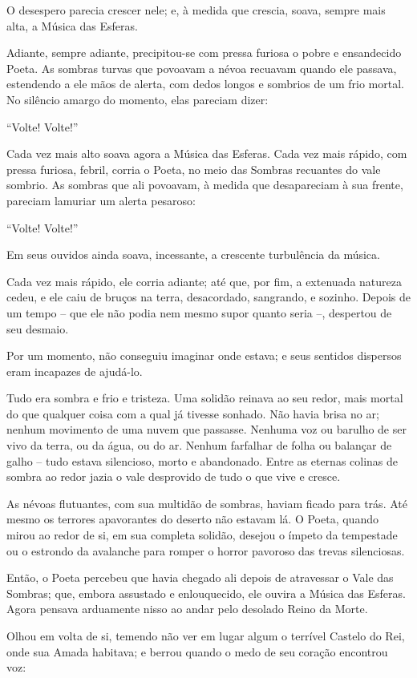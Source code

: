 O desespero parecia crescer nele; e, à medida que crescia, soava, sempre
mais alta, a Música das Esferas.

Adiante, sempre adiante, precipitou-se com pressa furiosa o pobre e
ensandecido Poeta. As sombras turvas que povoavam a névoa recuavam
quando ele passava, estendendo a ele mãos de alerta, com dedos longos e
sombrios de um frio mortal. No silêncio amargo do momento, elas pareciam
dizer:

``Volte! Volte!''

Cada vez mais alto soava agora a Música das Esferas. Cada vez mais
rápido, com pressa furiosa, febril, corria o Poeta, no meio das Sombras
recuantes do vale sombrio. As sombras que ali povoavam, à medida que
desapareciam à sua frente, pareciam lamuriar um alerta pesaroso:

``Volte! Volte!''

Em seus ouvidos ainda soava, incessante, a crescente turbulência da
música.

Cada vez mais rápido, ele corria adiante; até que, por fim, a extenuada
natureza cedeu, e ele caiu de bruços na terra, desacordado, sangrando, e
sozinho.
\smallskip
Depois de um tempo -- que ele não podia nem mesmo supor quanto seria --,
despertou de seu desmaio.

Por um momento, não conseguiu imaginar onde estava; e seus sentidos
dispersos eram incapazes de ajudá-lo.

Tudo era sombra e frio e tristeza. Uma solidão reinava ao seu redor,
mais mortal do que qualquer coisa com a qual já tivesse sonhado. Não
havia brisa no ar; nenhum movimento de uma nuvem que passasse. Nenhuma
voz ou barulho de ser vivo da terra, ou da água, ou do ar. Nenhum
farfalhar de folha ou balançar de galho -- tudo estava silencioso,
morto e abandonado. Entre as eternas colinas de sombra ao redor jazia o
vale desprovido de tudo o que vive e cresce.

As névoas flutuantes, com sua multidão de sombras, haviam ficado para
trás. Até mesmo os terrores apavorantes do deserto não estavam lá. O
Poeta, quando mirou ao redor de si, em sua completa solidão, desejou o
ímpeto da tempestade ou o estrondo da avalanche para romper o horror
pavoroso das trevas silenciosas.

Então, o Poeta percebeu que havia chegado ali depois de atravessar o
Vale das Sombras; que, embora assustado e enlouquecido, ele ouvira a
Música das Esferas. Agora pensava arduamente nisso ao andar pelo
desolado Reino da Morte.

Olhou em volta de si, temendo não ver em lugar algum o terrível Castelo
do Rei, onde sua Amada habitava; e berrou quando o medo de seu coração
encontrou voz:

